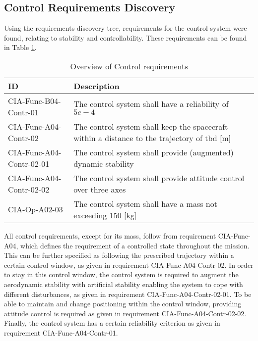 \subsection{Control Requirements Discovery} \label{sec:req-control}
Using the requirements discovery tree, requirements for the control system were found, relating to stability and controllability. These requirements can be found in Table \ref{tab:controlreq}.

\begin{table}[H]
	\caption{Overview of Control requirements}
	\begin{tabular}{|p{}|p{}|}
		\hline
		ID         					&	Description																							\\ \hline \hline
		CIA-Func-B04-Contr-01		&	The control system shall have a reliability of $5e-4$            									\\ \hline
		CIA-Func-A04-Contr-02 		&	The control system shall keep the spacecraft within a distance to the trajectory of \gls{tbd} [m]	\\ \hline	
		CIA-Func-A04-Contr-02-01 	&	The control system shall provide (augmented) dynamic stability       								\\ \hline
		CIA-Func-A04-Contr-02-02 	&	The control system shall provide attitude control over three axes         							\\ \hline	
		CIA-Op-A02-03	&	The control system shall have a mass not exceeding 150 [kg]  							\\ \hline
	\end{tabular}
	\label{tab:controlreq}
\end{table}

All control requirements, except for its mass, follow from requirement CIA-Func-A04, which defines the requirement of a controlled state throughout the mission. 
This can be further specified as following the prescribed trajectory within a certain control window, as given in requirement CIA-Func-A04-Contr-02. 
In order to stay in this control window, the control system is required to augment the aerodynamic stability with artificial stability enabling the system to cope with different disturbances, as given in requirement CIA-Func-A04-Contr-02-01. 
To be able to maintain and change positioning within the control window, providing attitude control is required as given in requirement CIA-Func-A04-Contr-02-02. 
Finally, the control system has a certain reliability criterion as given in requirement CIA-Func-A04-Contr-01.